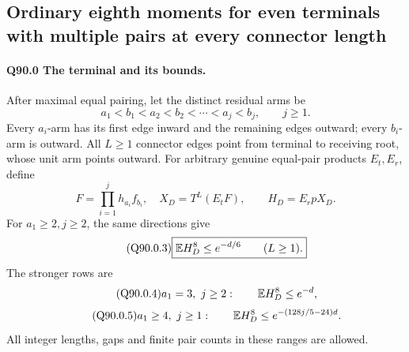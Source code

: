 \subsection{Ordinary eighth moments for even terminals with multiple pairs at every connector length}\label{proof:Q5-C090-ordinary}

\paragraph{Q90.0 The terminal and its bounds.}
After maximal equal pairing, let the distinct residual arms be
\begin{equation}\tag{Q90.0.1}\label{eq:Q90:0.1}
a_1<b_1<a_2<b_2<\cdots<a_j<b_j,\qquad j\ge1.
\end{equation}
Every \(a_i\)-arm has its first edge inward and the remaining edges
outward; every \(b_i\)-arm is outward. All \(L\ge\allowbreak 1\) connector edges
point from terminal to receiving root, whose unit arm points outward.
For arbitrary genuine equal-pair products \(E_t,\allowbreak E_r\), define
\begin{equation}\tag{Q90.0.2}\label{eq:Q90:0.2}
F=\prod_{i=1}^jh_{a_i}f_{b_i},\quad
X_D=T^L(E_tF),\qquad H_D=E_rpX_D.
\end{equation}
For \(a_1\ge\allowbreak 2,\allowbreak j\ge\allowbreak 2\), the same directions give
\begin{equation}\tag{Q90.0.3}\label{eq:Q90:0.3}
\boxed{\mathbb E H_D^8\le e^{-d/6}\qquad(L\ge1).}
\end{equation}
The stronger rows are
\begin{equation}\tag{Q90.0.4}\label{eq:Q90:0.4}
a_1=3,\ j\ge2:\qquad\mathbb E H_D^8\le e^{-d},
\end{equation}
\begin{equation}\tag{Q90.0.5}\label{eq:Q90:0.5}
a_1\ge4,\ j\ge1:\qquad
\mathbb E H_D^8\le e^{-(128j/5-24)d}.
\end{equation}
All integer lengths, gaps and finite pair counts in these ranges are allowed.

